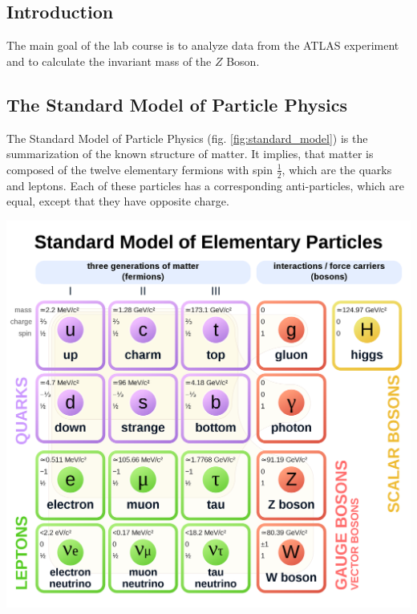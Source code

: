 \documentclass[12pt, a4paper, bibliography=totoc]{scrartcl}
\begin{document}
\tableofcontents
\newpage
\begin{multicols}{2}
\section{Introduction}

The main goal of the lab course is to analyze data from the ATLAS experiment and 
to calculate the invariant mass of the $Z$ Boson. 

\subsection{The Standard Model of Particle Physics}

The Standard Model of Particle Physics (fig. \ref{fig:standard_model}) is the summarization of the known structure of matter.
It implies, that matter is composed of the twelve elementary fermions with spin $\frac{1}{2}$, which are the quarks and leptons. 
Each of these particles has a corresponding anti-particles, which are equal, except that they have opposite charge.

    \begin{center}
    \includegraphics[width=\linewidth]{fig/standard_model.png}
\label{fig:standard_model}
    \end{center}


\end{multicols}
\end{document}

